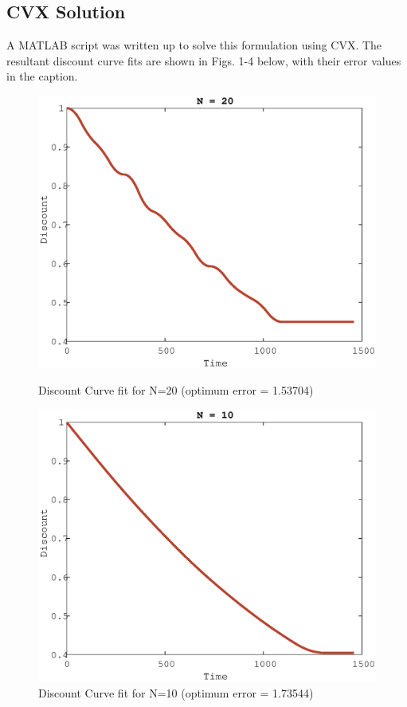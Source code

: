 \documentclass[a4paper]{article}
\begin{document}
\subsection{CVX Solution}
A MATLAB script was written up to solve this formulation using CVX.
The resultant discount curve fits are shown in Figs. 1-4 below, with their error values in the caption.

\begin{figure}[!ht]
  \centering
  \begin{minipage}[b]{0.4\textwidth}
    \includegraphics[width=1.0\textwidth]{N20.eps}
    \caption{Discount Curve fit for N=20 (optimum error = 1.53704)}
  \end{minipage}
  \hfill
  \begin{minipage}[b]{0.4\textwidth}
    \includegraphics[width=1.0\textwidth]{N10.eps}
    \caption{Discount Curve fit for N=10 (optimum error = 1.73544)}
  \end{minipage}
\end{figure}
\end{document}
